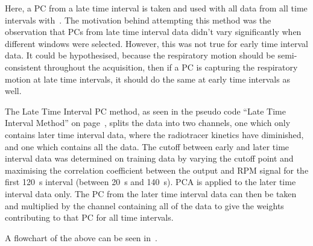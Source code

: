                 Here, a \gls{PC} from a late time interval is taken and used with all data from all time intervals with~. The motivation behind attempting this method was the observation that \glspl{PC} from late time interval data didn't vary significantly when different windows were selected. However, this was not true for early time interval data. It could be hypothesised, because the respiratory motion should be semi-consistent throughout the acquisition, then if a \gls{PC} is capturing the respiratory motion at late time intervals, it should do the same at early time intervals as well.
                    
                The Late Time Interval \gls{PC} method, as seen in the pseudo code ``Late Time Interval Method'' on page~\pageref{alg:pca_data_driven_surrogate_signal_extraction_methods_for_dynamic_pet_methods_late_time_interval_method_pseudo_code}, splits the data into two channels, one which only contains later time interval data, where the radiotracer kinetics have diminished, and one which contains all the data. The cutoff between early and later time interval data was determined on training data by varying the cutoff point and maximising the correlation coefficient between the output and \gls{RPM} signal for the first \SI{120}{\second} interval (between \SI{20}{\second} and \SI{140}{\second}). \gls{PCA} is applied to the later time interval data only. The \gls{PC} from the later time interval data can then be taken and multiplied by the channel containing all of the data to give the weights contributing to that \gls{PC} for all time intervals.

                A flowchart of the above can be seen in~.

